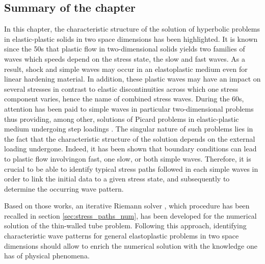 


\subsection*{Summary of the chapter}

In this chapter, the characteristic structure of the solution of hyperbolic problems in elastic-plastic solids in two space dimensions has been highlighted.
It is known since the 50s that plastic flow in two-dimensional solids yields two families of waves which speeds depend on the stress state, the slow and fast waves.
As a result, shock and simple waves may occur in an elastoplastic medium even for linear hardening material.
In addition, these plastic waves may have an impact on several stresses in contrast to elastic discontinuities across which one stress component varies, hence the name of combined stress waves.
During the 60s, attention has been paid to simple waves in particular two-dimensional problems thus providing, among other, solutions of Picard problems in elastic-plastic medium undergoing step loadings \cite{Clifton,Ting68,Ting69,Ting73}. %
The singular nature of such problems lies in the fact that the characteristic structure of the solution depends on the external loading undergone.
Indeed, it has been shown \cite{Clifton} that boundary conditions can lead to plastic flow involvingon fast, one slow, or both simple waves.
Therefore, it is crucial to be able to identify typical stress paths followed in each simple waves in order to link the initial data to a given stress state, and subsequently to determine the occurring wave pattern.

Based on those works, an iterative Riemann solver \cite{Lin_et_Ballman}, which procedure has been recalled in section \ref{sec:stress_paths_num}, has been developed for the numerical solution of the thin-walled tube problem. %
Following this approach, identifying characteristic wave patterns for general elastoplastic problems in two space dimensions should allow to enrich the numerical solution with the knowledge one has of physical phenomena.


